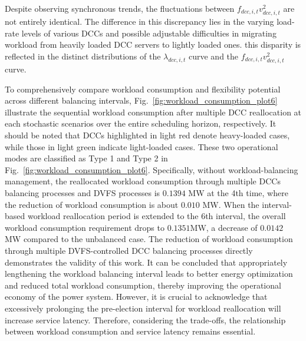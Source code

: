 \documentclass[lettersize,journal]{IEEEtran}
\begin{document}
Despite observing synchronous trends, the fluctuations between \(f_{dcc,i,t} v_{dcc,i,t}^2\) are not entirely identical. The difference in this discrepancy lies in the varying load-rate levels of various DCCs and possible adjustable difficulties in migrating workload from heavily loaded DCC servers to lightly loaded ones.
this disparity is reflected in the distinct distributions of the \(\lambda_{dcc,i,t}\) curve and the \(f_{dcc,i,t} v_{dcc,i,t}^2\) curve.



To comprehensively compare workload consumption and flexibility potential across different balancing intervals,
Fig.~\ref{fig:workload_consumption_plot6} illustrate the sequential workload consumption after multiple DCC reallocation at each stochastic scenarios over the entire scheduling
horizon, respectively. It should be noted that DCCs highlighted in light red denote heavy-loaded cases, while those in light green indicate light-loaded cases. These two operational modes are classified as Type 1 and Type 2 in Fig.~\ref{fig:workload_consumption_plot6}.
Specifically, without workload-balancing management, the reallocated workload consumption through multiple DCCs balancing
processes and DVFS processes is $0.1394$ MW at the 4th time, where the reduction of
workload consumption is about $0.010$ MW. When the interval-based workload reallocation period is extended to the $6$th interval, the overall workload consumption
requirement drops to $0.1351$MW, a decrease of
$0.0142$ MW compared to the unbalanced case. The reduction of workload consumption through multiple DVFS-controlled DCC balancing processes directly
demonstrates the validity of this work. It can be concluded that appropriately lengthening the workload balancing interval leads to better energy
optimization and reduced total workload consumption, thereby improving the operational economy of the power system. However, it is crucial to
acknowledge that excessively prolonging the pre-election interval for workload reallocation will increase service latency. Therefore, considering the
trade-offs, the relationship between workload consumption and service latency remains essential.
\end{document}
